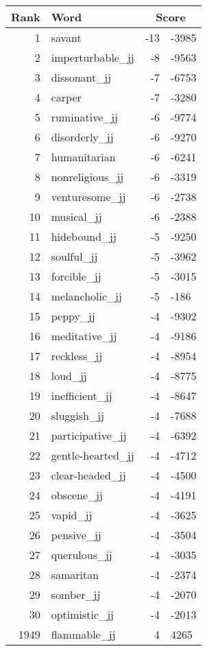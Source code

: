 \begin{longtable}[!htbp]{| rlr@{.}l |}
    \hline
    \textbf{Rank} & \textbf{Word} & \multicolumn{2}{c|}{\textbf{Score}} \\
    \hline
    \endhead
    1 & savant & -13 & -3985 \\
    2 & imperturbable\_jj & -8 & -9563 \\
    3 & dissonant\_jj & -7 & -6753 \\
    4 & carper & -7 & -3280 \\
    5 & ruminative\_jj & -6 & -9774 \\
    6 & disorderly\_jj & -6 & -9270 \\
    7 & humanitarian & -6 & -6241 \\
    8 & nonreligious\_jj & -6 & -3319 \\
    9 & venturesome\_jj & -6 & -2738 \\
    10 & musical\_jj & -6 & -2388 \\
    11 & hidebound\_jj & -5 & -9250 \\
    12 & soulful\_jj & -5 & -3962 \\
    13 & forcible\_jj & -5 & -3015 \\
    14 & melancholic\_jj & -5 & -186 \\
    15 & peppy\_jj & -4 & -9302 \\
    16 & meditative\_jj & -4 & -9186 \\
    17 & reckless\_jj & -4 & -8954 \\
    18 & loud\_jj & -4 & -8775 \\
    19 & inefficient\_jj & -4 & -8647 \\
    20 & sluggish\_jj & -4 & -7688 \\
    21 & participative\_jj & -4 & -6392 \\
    22 & gentle-hearted\_jj & -4 & -4712 \\
    23 & clear-headed\_jj & -4 & -4500 \\
    24 & obscene\_jj & -4 & -4191 \\
    25 & vapid\_jj & -4 & -3625 \\
    26 & pensive\_jj & -4 & -3504 \\
    27 & querulous\_jj & -4 & -3035 \\
    28 & samaritan & -4 & -2374 \\
    29 & somber\_jj & -4 & -2070 \\
    30 & optimistic\_jj & -4 & -2013 \\
    1949 & flammable\_jj & 4 & 4265 \\

\end{longtable}
